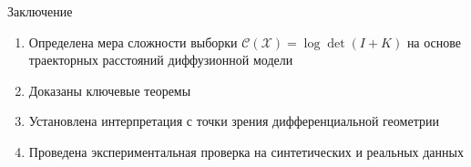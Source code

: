 \documentclass[aspectratio=169]{beamer}
\begin{document}
\begin{frame}{Заключение}
    \begin{enumerate}
        \item Определена мера сложности выборки $\mathcal{C}(\mathcal{X}) = \log\det(I+K)$
              на основе траекторных расстояний диффузионной модели
        \item Доказаны ключевые теоремы
        \item Установлена интерпретация с точки зрения дифференциальной геометрии
        \item Проведена экспериментальная проверка на синтетических  и реальных данных
    \end{enumerate}
\end{frame}
\end{document}
